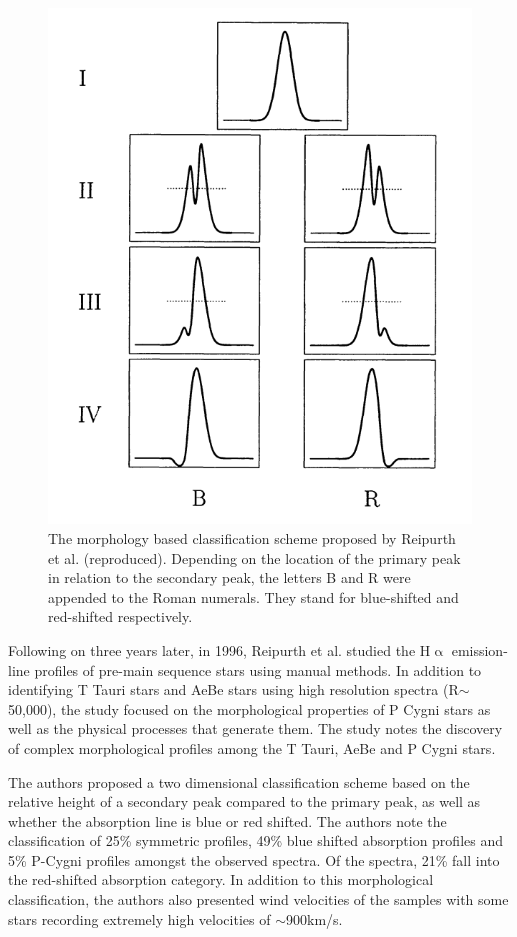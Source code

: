 \begin{figure}[!htb]
\centering
\includegraphics[scale=1]{figures/reipurth classes.png}
\caption{The morphology based classification scheme proposed by Reipurth et al. (reproduced). Depending on the location of the primary peak in relation to the secondary peak, the letters B and R were appended to the Roman numerals. They stand for blue-shifted and red-shifted respectively.}
\end{figure}

Following on three years later, in 1996, Reipurth et al. studied the H$\upalpha$ emission-line profiles of pre-main sequence stars using manual methods. In addition to identifying T Tauri stars and AeBe stars using high resolution spectra (R$\sim$50,000), the study focused on the morphological properties of P Cygni stars as well as the physical processes that generate them. The study notes the discovery of complex morphological profiles among the T Tauri, AeBe and P Cygni stars. 

The authors proposed a two dimensional classification scheme based on the relative height of a secondary peak compared to the primary peak, as well as whether the absorption line is blue or red shifted. The authors note the classification of 25\% symmetric profiles, 49\% blue shifted absorption profiles and 5\% P-Cygni profiles amongst the observed spectra. Of the spectra, 21\% fall into the red-shifted absorption category. In addition to this morphological classification, the authors also presented wind velocities of the samples with some stars recording extremely high velocities of $\sim$900km/s\cite{reipurth1996halpha}. 

